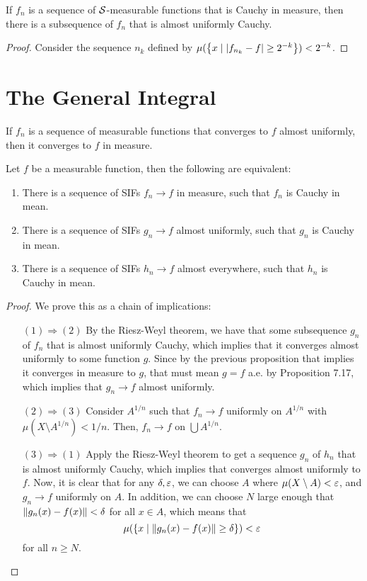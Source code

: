 \begin{theorem}
    If $f_n$ is a sequence of $\mathcal S$-measurable functions that is Cauchy in measure, then there is a subsequence of $f_n$ that is almost uniformly Cauchy.
\end{theorem}

\begin{proof}
    Consider the sequence $n_k$ defined by $\mu(\qty{x \mid \abs{f_{n_k} - f} \ge 2^{-k}}) < 2^{-k}$.
\end{proof}

\section{The General Integral}

\begin{proposition}
    If $f_n$ is a sequence of measurable functions that converges to $f$ almost uniformly, then it converges to $f$ in measure.
\end{proposition}

\begin{theorem}
    Let $f$ be a measurable function, then the following are equivalent:
    \begin{enumerate}
        \item There is a sequence of SIFs $f_n \to f$ in measure, such that $f_n$ is Cauchy in mean.
        \item There is a sequence of SIFs $g_n \to f$ almost uniformly, such that $g_n$ is Cauchy in mean.
        \item There is a sequence of SIFs $h_n \to f$ almost everywhere, such that $h_n$ is Cauchy in mean.
    \end{enumerate}
\end{theorem}

\begin{proof}
    We prove this as a chain of implications:
    \begin{enumerate}
        \item[$(1) \Rightarrow (2)$] By the Riesz-Weyl theorem, we have that some subsequence $g_n$ of $f_n$ that is almost uniformly Cauchy, which implies that  it converges almost uniformly to some function $g$. Since by the previous proposition that implies it converges in measure to $g$, that must mean $g = f$ a.e. by Proposition 7.17, which implies that $g_n \to f$ almost uniformly.
        \item[$(2) \Rightarrow (3)$] Consider $A^{1/n}$ such that $f_n \to f$ uniformly on $A^{1/n}$ with $\mu(X \setminus A^{1/n}) < 1/n$. Then, $f_n \to f$ on $\bigcup A^{1/n}$.
        \item[$(3) \Rightarrow (1)$] Apply the Riesz-Weyl theorem to get a sequence $g_n$ of $h_n$ that is almost uniformly Cauchy, which implies that converges almost uniformly to $f$. Now, it is clear that for any $\delta, \varepsilon$, we can choose $A$ where $\mu(X \setminus A) < \varepsilon$, and $g_n \to f$ uniformly on $A$. In addition, we can choose $N$ large enough that $\norm{g_n(x) - f(x)} < \delta$ for all $x \in A$, which means that \[\mu\qty(\qty{x \mid \norm{g_n(x) - f(x)} \ge \delta}) < \varepsilon\] for all $n \ge N$.
    \end{enumerate}
\end{proof}

